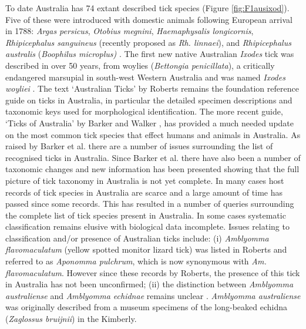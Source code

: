 \documentclass[a4paper, nobind]{templates/ociamthesis}
\begin{document}
To date Australia has 74 extant described tick species (Figure \ref{fig:F1ausixod}).
Five of these were introduced with domestic animals following European arrival in 1788: \emph{Argas persicus}, \emph{Otobius megnini}, \emph{Haemaphysalis longicornis}, \emph{Rhipicephalus sanguineus} (recently proposed as \emph{Rh. linnaei}), and \emph{Rhipicephalus australis} (\emph{Boophilus microplus)} \autocite{barkerTicksAustraliaSpecies2014}.
The first new native Australian \emph{Ixodes} tick was described in over 50 years, from woylies (\emph{Bettongia penicillata}), a critically endangered marsupial in south-west Western Australia and was named \emph{Ixodes woyliei} \autocite{ashMorphologicalMolecularDescription2017}.
The text `Australian Ticks' by Roberts \autocite*{robertsAustralianTicks1970} remains the foundation reference guide on ticks in Australia, in particular the detailed specimen descriptions and taxonomic keys used for morphological identification.
The more recent guide, `Ticks of Australia' by Barker and Walker \autocite*{barkerTicksAustraliaSpecies2014}, has provided a much needed update on the most common tick species that effect humans and animals in Australia.
As raised by Barker et al. \autocite*{barkerList70Species2014} there are a number of issues surrounding the list of recognised ticks in Australia.
Since Barker et al. \autocite*{barkerList70Species2014} there have also been a number of taxonomic changes and new information has been presented showing that the full picture of tick taxonomy in Australia is not yet complete.
In many cases host records of tick species in Australia are scarce and a large amount of time has passed since some records.
This has resulted in a number of queries surrounding the complete list of tick species present in Australia.
In some cases systematic classification remains elusive with biological data incomplete.
Issues relating to classification and/or presence of Australian ticks include:
(i) \emph{Amblyomma flavomaculatum} (yellow spotted monitor lizard tick) was listed in Roberts \autocite*{robertsAustralianSpeciesAponomma1953,robertsFurtherObservationsAustralian1964,robertsAustralianTicks1970} and referred to as \emph{Aponomma pulchrum}, which is now synonymous with \emph{Am. flavomaculatum}.
However since these records by Roberts, the presence of this tick in Australia has not been unconfirmed;
(ii) the distinction between \emph{Amblyomma australiense} and \emph{Amblyomma echidnae} remains unclear \autocite{guglielmoneCommentsControversialTick2009}. \emph{Amblyomma australiense} was originally described from a museum specimens of the long-beaked echidna (\emph{Zaglossus bruijnii}) in the Kimberly.
\end{document}
